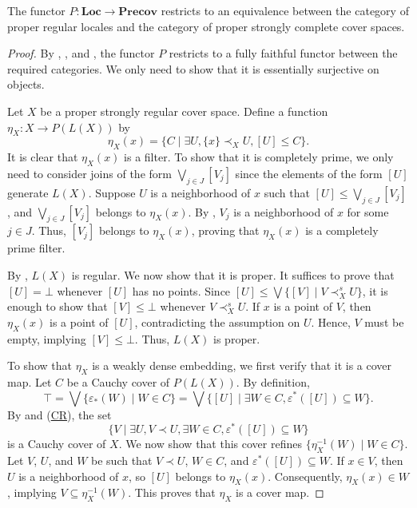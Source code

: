 \documentclass[pdflatex,sn-mathphys-num]{sn-jnl}
\newcommand{\axref}[1]{(\hyperref[ax:#1]{#1})}
\theoremstyle{definition}
\theoremstyle{remark}
\numberwithin{figure}{section}
\newcommand{\rb}{\prec}
\newcommand{\cat}[1]{\mathbf{#1}}
\begin{document}
\begin{thm}
The functor $P : \cat{Loc} \to \cat{Precov}$ restricts to an equivalence between the category of proper regular locales and the category of proper strongly complete cover spaces.
\end{thm}
\begin{proof}
By , , and , the functor $P$ restricts to a fully faithful functor between the required categories.
We only need to show that it is essentially surjective on objects.

Let $X$ be a proper strongly regular cover space.
Define a function $\eta_X : X \to P(L(X))$ by
\[ \eta_X(x) = \{ C \mid \exists U, \{ x \} \rb_X U, [U] \leq C \}. \]
It is clear that $\eta_X(x)$ is a filter.
To show that it is completely prime, we only need to consider joins of the form $\bigvee_{j \in J} [V_j]$ since the elements of the form $[U]$ generate $L(X)$.
Suppose $U$ is a neighborhood of $x$ such that $[U] \leq \bigvee_{j \in J} [V_j]$, and $\bigvee_{j \in J} [V_j]$ belongs to $\eta_X(x)$.
By , $V_j$ is a neighborhood of $x$ for some $j \in J$.
Thus, $[V_j]$ belongs to $\eta_X(x)$, proving that $\eta_X(x)$ is a completely prime filter.

By , $L(X)$ is regular.
We now show that it is proper.
It suffices to prove that $[U] = \bot$ whenever $[U]$ has no points.
Since $[U] \leq \bigvee \{ [V] \mid V \rb^s_X U \}$, it is enough to show that $[V] \leq \bot$ whenever $V \rb^s_X U$.
If $x$ is a point of $V$, then $\eta_X(x)$ is a point of $[U]$, contradicting the assumption on $U$.
Hence, $V$ must be empty, implying $[V] \leq \bot$.
Thus, $L(X)$ is proper.

To show that $\eta_X$ is a weakly dense embedding, we first verify that it is a cover map.
Let $C$ be a Cauchy cover of $P(L(X))$.
By definition, 
\[
\top = \bigvee \{ \varepsilon_*(W) \mid W \in C \} = \bigvee \{ [U] \mid \exists W \in C, \varepsilon^*([U]) \subseteq W \}.
\]
By  and \axref{CR}, the set 
\[
\{ V \mid \exists U, V \rb U, \exists W \in C, \varepsilon^*([U]) \subseteq W \}
\]
is a Cauchy cover of $X$.
We now show that this cover refines $\{ \eta_X^{-1}(W) \mid W \in C \}$.
Let $V$, $U$, and $W$ be such that $V \rb U$, $W \in C$, and $\varepsilon^*([U]) \subseteq W$.
If $x \in V$, then $U$ is a neighborhood of $x$, so $[U]$ belongs to $\eta_X(x)$.
Consequently, $\eta_X(x) \in W$, implying $V \subseteq \eta_X^{-1}(W)$.
This proves that $\eta_X$ is a cover map.


\end{proof}
\end{document}
